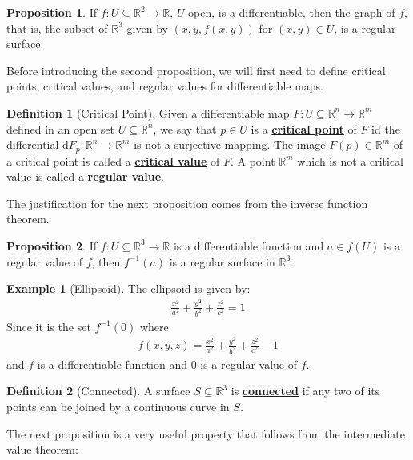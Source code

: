 \documentclass[11pt]{scrartcl}
\newcommand{\R}[0]{\mathbb{R}}
\theoremstyle{definition}
\newtheorem{definition}{Definition}
\newtheorem{prop}{Proposition}
\newtheorem{ex}{Example}
\theoremstyle{remark}
\newcommand{\dfn}[1]{\textbf{\underline{#1}}}
\begin{document}
{\begin{prop}
	If $f: U \subseteq \R^2 \rightarrow \R$, $U$ open, is a differentiable, then the graph of $f$, that is, the subset of $\R^3$ given by $(x,y, f(x,y))$ for $(x,y) \in U$, is a regular surface. 
\end{prop}

Before introducing the second proposition, we will first need to define critical points, critical values, and regular values for differentiable maps. 

\begin{definition}[Critical Point] 
	Given a differentiable map $F: U \subseteq \R^n \rightarrow \R^m$ defined in an open set $U \subseteq \R^n$, we say that $p \in U$ is a \dfn{critical point} of $F$ id the differential d$F_p: \R^n \rightarrow \R^m$ is not a surjective mapping. The image $F(p) \in \R^m$ of a critical point is called a \dfn{critical value} of $F$. A point $\R^m$ which is not a critical value is called a \dfn{regular value}. 
\end{definition}

The justification for the next proposition comes from the inverse function theorem. 

\begin{prop}
	If $f: U \subseteq \R^3 \rightarrow \R$ is a differentiable function and $a \in f(U)$ is a regular value of $f$, then $f^{-1}(a)$ is a regular surface in $\R^3$. 
\end{prop}

\begin{ex}[Ellipsoid] 
		The ellipsoid is given by: 
		\begin{align*}
			\frac{x^2}{a^2} + \frac{y^2}{b^2} + \frac{z^2}{c^2} = 1
		\end{align*}
		Since it is the set $f^{-1}(0)$ where 
		\begin{align*}
			f(x,y,z) = \frac{x^2}{a^2} + \frac{y^2}{b^2} + \frac{z^2}{c^2} - 1
		\end{align*}
		and $f$ is a differentiable function and $0$ is a regular value of $f$. 
\end{ex}

\begin{definition}[Connected] 
	A surface $S \subseteq \R^3$ is \dfn{connected} if any two of its points can be joined by a continuous curve in $S$. 
\end{definition}

The next proposition is a very useful property that follows from the intermediate value theorem: 

}
\end{document}
